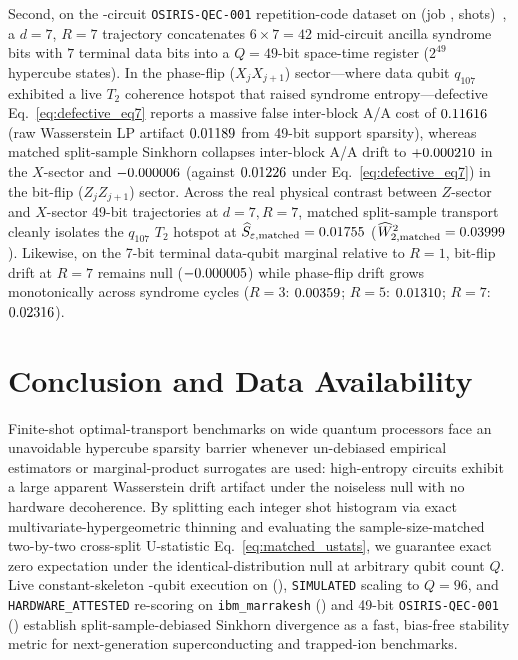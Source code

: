 \documentclass[aps,prapplied,reprint,longbibliography]{revtex4-2}
\begin{document}
Second, on the \WpQecCircuits{}-circuit \texttt{OSIRIS-QEC-001} repetition-code dataset on \texttt{\WpFezBackend{}} (job \texttt{\WpQecJobId{}}, \WpQecTotalShots{} shots)~\cite{davis2026qec001}, a $d=7$, $R=7$ trajectory concatenates $6 \times 7 = 42$ mid-circuit ancilla syndrome bits with $7$ terminal data bits into a $Q=49$-bit space-time register ($2^{49}$ hypercube states). In the phase-flip ($X_j X_{j+1}$) sector---where data qubit $q_{107}$ exhibited a live $T_2$ coherence hotspot that raised syndrome entropy---defective Eq.~\eqref{eq:defective_eq7} reports a massive false inter-block A/A cost of $0.11616{}$ (raw Wasserstein LP artifact $0.01189{}$ from 49-bit support sparsity), whereas matched split-sample Sinkhorn collapses inter-block A/A drift to $+0.000210{}$ in the $X$-sector and $-0.000006{}$ (against $0.01226{}$ under Eq.~\eqref{eq:defective_eq7}) in the bit-flip ($Z_j Z_{j+1}$) sector. Across the real physical contrast between $Z$-sector and $X$-sector 49-bit trajectories at $d=7, R=7$, matched split-sample transport cleanly isolates the $q_{107}$ $T_2$ hotspot at $\widehat{S}_{\varepsilon,\mathrm{matched}} = 0.01755{}$ ($\widehat{W}_{2,\mathrm{matched}}^2 = 0.03999{}$). Likewise, on the 7-bit terminal data-qubit marginal relative to $R=1$, bit-flip drift at $R=7$ remains null ($-0.000005{}$) while phase-flip drift grows monotonically across syndrome cycles ($R=3$: $0.00359{}$; $R=5$: $0.01310{}$; $R=7$: $0.02316{}$).

\section{Conclusion and Data Availability}
\label{sec:conclusion}

Finite-shot optimal-transport benchmarks on wide quantum processors face an unavoidable hypercube sparsity barrier whenever un-debiased empirical estimators or marginal-product surrogates are used: high-entropy circuits exhibit a large apparent Wasserstein drift artifact under the noiseless null with no hardware decoherence. By splitting each integer shot histogram via exact multivariate-hypergeometric thinning and evaluating the sample-size-matched two-by-two cross-split U-statistic Eq.~\eqref{eq:matched_ustats}, we guarantee exact zero expectation under the identical-distribution null at arbitrary qubit count $Q$. Live constant-skeleton \WpFezQubits{}-qubit execution on \texttt{\WpFezBackend{}} (\texttt{\WpFezJobId{}}), \texttt{SIMULATED} scaling to $Q=96$, and \texttt{HARDWARE\_ATTESTED} re-scoring on \texttt{ibm\_marrakesh} (\texttt{\WpMarrJobId{}}) and 49-bit \texttt{OSIRIS-QEC-001} (\texttt{\WpQecJobId{}}) establish split-sample-debiased Sinkhorn divergence as a fast, bias-free stability metric for next-generation superconducting and trapped-ion benchmarks.
\end{document}
